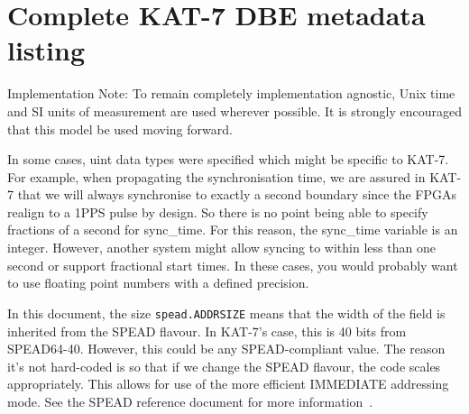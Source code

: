 \documentclass[11pt,english,twoside]{article}
\begin{document}
\section{Complete KAT-7 DBE metadata listing}
Implementation Note: To remain completely implementation agnostic, Unix time and SI units of measurement are used wherever possible. It is
strongly encouraged that this model be used moving forward.

In some cases, uint data types were specified which might be specific to KAT-7. For example, when propagating the synchronisation time, we are
assured in KAT-7 that we will always synchronise to exactly a second boundary since the FPGAs realign to a 1PPS pulse by design. So there is no
point being able to specify fractions of a second for sync\_time. For this reason, the sync\_time variable is an integer. However, another
system might allow syncing to within less than one second or support fractional start times. In these cases, you would probably want to use floating
point numbers with a defined precision.

In this document, the size {\tt spead.ADDRSIZE} means that the width of the field is inherited from the SPEAD flavour. In KAT-7's case, this is
40 bits from SPEAD64-40. However, this could be any SPEAD-compliant value. The reason it's not hard-coded is so that if we change the SPEAD
flavour, the code scales appropriately. This allows for use of the more efficient IMMEDIATE addressing mode. See the SPEAD reference document
for more information~\cite{speadprotocolska}. %

\end{document}
